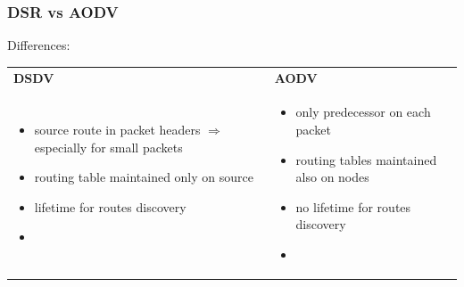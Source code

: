 \subsubsection{DSR vs AODV}
Differences:
\vspace*{0.2cm}
\begin{center}
    \begin{tabular}{|p{5.5cm}|p{5.5cm}|}
        \hline
        \centering \textbf{DSDV} & \centering \textbf{AODV} \arraybackslash\\
        \begin{minipage}{1 \textwidth}
            \vspace*{0.1cm}
            \begin{itemize}
                \addtolength{\itemindent}{-0.5cm}
                \item source route in packet headers \newline\hspace*{-0.5cm}$\Rightarrow$ especially for small packets 
                \vspace*{0.15cm}
                \item routing table maintained only \newline\hspace*{-0.5cm}on source
                \vspace*{0.15cm}
                \item lifetime for routes discovery
                \item[]
            \end{itemize}
        \end{minipage}
        &
        \begin{minipage}{1 \textwidth}
            \vspace*{0.1cm}
            \begin{itemize}
                \addtolength{\itemindent}{-0.5cm}
                \item only predecessor on each \newline\hspace*{-0.5cm}packet
                \vspace*{0.15cm}
                \item routing tables maintained also \newline\hspace*{-0.5cm}on nodes
                \vspace*{0.15cm}
                \item no lifetime for routes discovery
                \item[]
            \end{itemize}
        \end{minipage}
        \\
        \hline
    \end{tabular}
\end{center}

